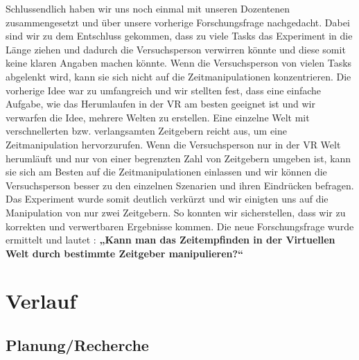 \documentclass{Bericht}
\begin{document}
	Schlussendlich haben wir uns noch einmal mit unseren Dozentenen zusammengesetzt und über unsere vorherige Forschungsfrage nachgedacht. Dabei sind wir zu dem Entschluss gekommen, dass zu viele Tasks das Experiment in die Länge ziehen und dadurch die Versuchsperson verwirren könnte und diese somit keine klaren Angaben machen könnte. Wenn die Versuchsperson von vielen Tasks abgelenkt wird, kann sie sich nicht auf die Zeitmanipulationen konzentrieren. Die vorherige Idee war zu umfangreich und wir stellten fest, dass eine einfache Aufgabe, wie das Herumlaufen in der VR am besten geeignet ist und wir verwarfen die Idee, mehrere Welten zu erstellen. Eine einzelne Welt mit verschnellerten bzw. verlangsamten Zeitgebern reicht aus, um eine Zeitmanipulation hervorzurufen. Wenn die Versuchsperson nur in der VR Welt herumläuft und nur von einer begrenzten Zahl von Zeitgebern umgeben ist, kann sie sich am Besten auf die Zeitmanipulationen einlassen und wir können die Versuchsperson besser zu den einzelnen Szenarien und ihren Eindrücken befragen. 
 Das Experiment wurde somit deutlich verkürzt und wir einigten uns auf die Manipulation von nur zwei Zeitgebern. So konnten wir sicherstellen, dass wir zu korrekten und verwertbaren Ergebnisse kommen. Die neue Forschungsfrage wurde ermittelt und lautet : \textbf{„Kann man das Zeitempfinden in der Virtuellen Welt durch bestimmte Zeitgeber manipulieren?“}

\section{Verlauf} %
	\subsection{Planung/Recherche} %
	
\end{document}
